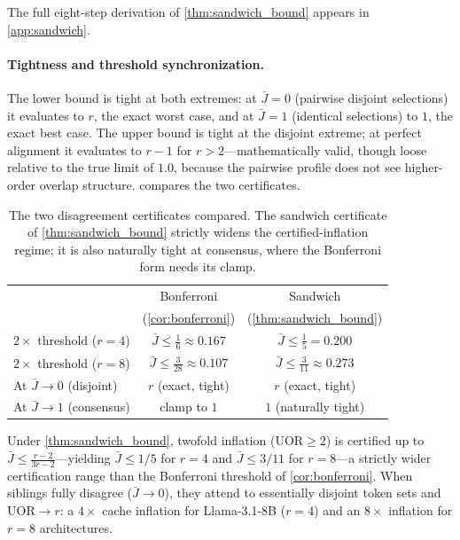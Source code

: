 \documentclass[final,5p,times,twocolumn]{elsarticle}
\theoremstyle{definition}
\theoremstyle{remark}
\newcommand{\UOR}{\mathrm{UOR}}
\begin{document}
The full eight-step derivation of \cref{thm:sandwich_bound} appears in
\cref{app:sandwich}.

\paragraph{Tightness and threshold synchronization.}
The lower bound is tight at both extremes: at $\bar{J}=0$ (pairwise
disjoint selections) it evaluates to $r$, the exact worst case, and at
 $\bar{J}=1$ (identical selections) to $1$, the exact best case. The
upper bound is tight at the disjoint extreme; at perfect alignment it
evaluates to $r-1$ for $r>2$---mathematically valid, though loose
relative to the true limit of $1.0$, because the pairwise profile does
not see higher-order overlap structure.
 compares the two certificates.

\begin{table}[t]
\centering\small
\caption{The two disagreement certificates compared. The sandwich
  certificate of \cref{thm:sandwich_bound} strictly widens the
  certified-inflation regime; it is also naturally tight at consensus,
  where the Bonferroni form needs its clamp.}
\label{tab:certificates}
\begin{tabular}{@{}lcc@{}}
\toprule
 & Bonferroni & Sandwich \\
 & (\cref{cor:bonferroni}) & (\cref{thm:sandwich_bound}) \\
\midrule
 $2\times$ threshold ($r{=}4$) &
 $\bar{J} \le \frac{1}{6} \approx 0.167$ &
 $\bar{J} \le \frac{1}{5} = 0.200$ \\
 $2\times$ threshold ($r{=}8$) &
 $\bar{J} \le \frac{3}{28} \approx 0.107$ &
 $\bar{J} \le \frac{3}{11} \approx 0.273$ \\
At $\bar{J} \to 0$ (disjoint) & $r$ (exact, tight) &
 $r$ (exact, tight) \\
At $\bar{J} \to 1$ (consensus) & clamp to $1$ & $1$ (naturally tight) \\
\bottomrule
\end{tabular}
\end{table}

Under \cref{thm:sandwich_bound}, twofold inflation ($\UOR \ge 2$) is
certified up to $\bar{J} \le \frac{r-2}{3r-2}$---yielding
 $\bar{J} \le 1/5$ for $r=4$ and $\bar{J} \le 3/11$ for $r=8$---a
strictly wider certification range than the Bonferroni threshold of
\cref{cor:bonferroni}. When siblings fully disagree ($\bar{J} \to 0$),
they attend to essentially disjoint token sets and $\UOR \to r$: a
 $4\times$ cache inflation for Llama-3.1-8B ($r=4$) and an $8\times$ inflation for $r=8$ architectures.
\end{document}
